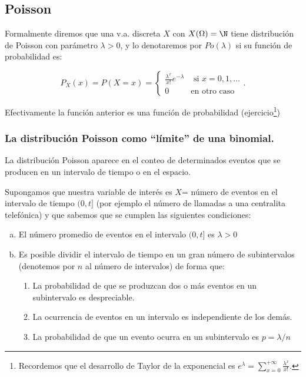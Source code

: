      \subsection{Poisson}
     
   
     
     Formalmente diremos que una v.a. discreta $X$ con $X(\Omega)=\N$ tiene
     distribución de Poisson con parámetro $\lambda>0$, y lo denotaremos
     por $Po(\lambda)$ si su función de probabilidad es:

    $$P_{X}(x)=P(X=x)=
    \left\{\begin{array}{ll}
    \frac{\lambda^x}{x!} e^{-\lambda}& \mbox{ si } x=0,1,\ldots\\
     0 & \mbox{en otro caso}\end{array}\right..$$

Efectivamente la función anterior es una función de probabilidad (ejercicio\footnote{
Recordemos que el desarrollo de Taylor de la exponencial es $e^{\lambda}=\sum_{x=0}^{+\infty} \frac{\lambda^x}{x!}$.
})

    \subsubsection{La distribución Poisson como ``límite'' de una binomial.}
    


    La distribución Poisson aparece en el conteo de determinados  eventos que se
    producen en un intervalo de tiempo o en el espacio.

       Supongamos que nuestra variable de interés es  $X$= número de
    eventos en el intervalo de tiempo $(0,t]$ (por ejemplo el número de
    llamadas a una centralita telefónica) y que sabemos que se
    cumplen las siguientes condiciones:


    \begin{enumerate}[a)]
        \item El número promedio de eventos en el intervalo $(0,t]$ es
        $\lambda>0$
        \item Es posible dividir el intervalo de tiempo en un
        gran número de subintervalos (denotemos por $n$ al número de intervalos) de forma que:
        \begin{enumerate}[1)]
        \item La probabilidad de que se produzcan dos o más eventos en un
        subintervalo es des\-pre\-cia\-ble.
        \item La ocurrencia de eventos en un intervalo  es
        independiente de los demás.
        \item La probabilidad de que un evento ocurra en un subintervalo
        es $p=\lambda/n$
        \end{enumerate}
        \end{enumerate}


